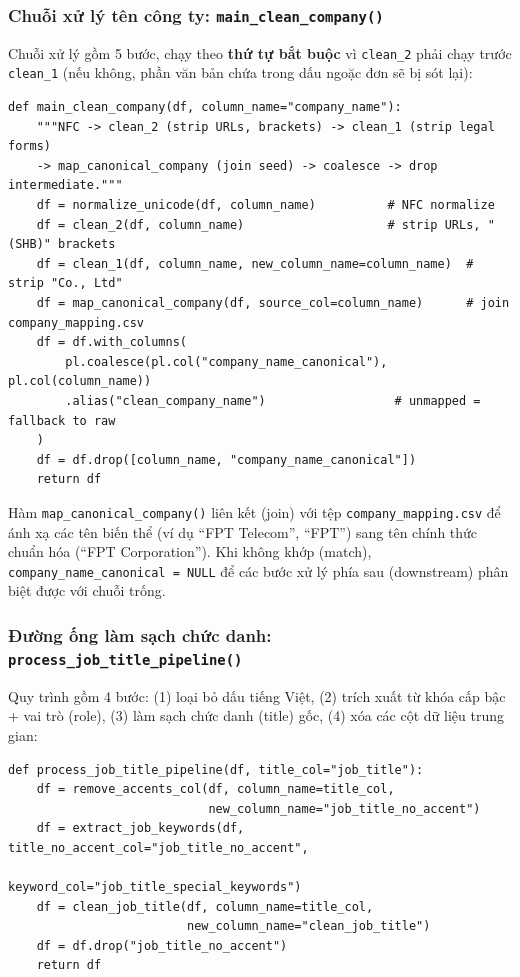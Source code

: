 \subsubsection{Chuỗi xử lý tên công ty: \texttt{main\_clean\_company()}}

Chuỗi xử lý gồm 5 bước, chạy theo \textbf{thứ tự bắt buộc} vì \texttt{clean\_2} phải
chạy trước \texttt{clean\_1} (nếu không, phần văn bản chứa trong dấu ngoặc đơn sẽ bị sót lại):

\begin{lstlisting}[style=pystyle, caption={Chuỗi làm sạch tên công ty gồm 5 bước}, label={lst:clean-company}]
def main_clean_company(df, column_name="company_name"):
    """NFC -> clean_2 (strip URLs, brackets) -> clean_1 (strip legal forms)
    -> map_canonical_company (join seed) -> coalesce -> drop intermediate."""
    df = normalize_unicode(df, column_name)          # NFC normalize
    df = clean_2(df, column_name)                    # strip URLs, "(SHB)" brackets
    df = clean_1(df, column_name, new_column_name=column_name)  # strip "Co., Ltd"
    df = map_canonical_company(df, source_col=column_name)      # join company_mapping.csv
    df = df.with_columns(
        pl.coalesce(pl.col("company_name_canonical"), pl.col(column_name))
        .alias("clean_company_name")                  # unmapped = fallback to raw
    )
    df = df.drop([column_name, "company_name_canonical"])
    return df
\end{lstlisting}

Hàm \texttt{map\_canonical\_company()} liên kết (join) với tệp \texttt{company\_mapping.csv}
để ánh xạ các tên biến thể (ví dụ ``FPT Telecom'', ``FPT'') sang tên chính thức chuẩn hóa
(``FPT Corporation''). Khi không khớp (match), \texttt{company\_name\_canonical = NULL}
để các bước xử lý phía sau (downstream) phân biệt được với chuỗi trống.

\subsubsection{Đường ống làm sạch chức danh: \texttt{process\_job\_title\_pipeline()}}

Quy trình gồm 4 bước: (1) loại bỏ dấu tiếng Việt, (2) trích xuất từ khóa cấp bậc + vai trò (role),
(3) làm sạch chức danh (title) gốc, (4) xóa các cột dữ liệu trung gian:

\begin{lstlisting}[style=pystyle, caption={Job title: trích keyword + clean}, label={lst:title-pipeline}]
def process_job_title_pipeline(df, title_col="job_title"):
    df = remove_accents_col(df, column_name=title_col,
                            new_column_name="job_title_no_accent")
    df = extract_job_keywords(df, title_no_accent_col="job_title_no_accent",
                              keyword_col="job_title_special_keywords")
    df = clean_job_title(df, column_name=title_col,
                         new_column_name="clean_job_title")
    df = df.drop("job_title_no_accent")
    return df
\end{lstlisting}

